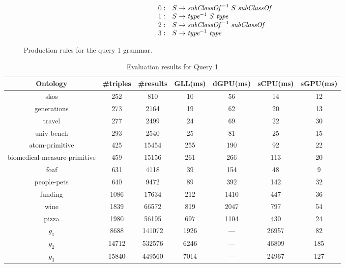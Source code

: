 \begin{figure}[h]
   \[
\begin{array}{rl}
   0: & S \rightarrow \text{\textit{subClassOf}}^{-1} \ S \ \text{\textit{subClassOf}} \\ 
   1: & S \rightarrow \text{\textit{type}}^{-1} \ S \ \text{\textit{type}} \\ 
   2: & S \rightarrow \text{\textit{subClassOf}}^{-1} \ \text{\textit{subClassOf}} \\ 
   3: & S \rightarrow \text{\textit{type}}^{-1} \ \text{\textit{type}} \\ 
\end{array}
\]
\caption{Production rules for the query 1 grammar.}
\label{ProductionRulesQuery1}
\end{figure}

\begin{table*}[ht]
\centering
\caption{Evaluation results for Query 1}
\label{tbl1}

\begin{tabular}{ | c | c | c | c | c | c | c |}
\hline
Ontology & \#triples & \#results & GLL(ms) & dGPU(ms) & sCPU(ms) & sGPU(ms) \\
\hline 
\hline
skos        & 252 & 810 & 10 & 56 & 14 & 12\\
generations & 273 & 2164 & 19 & 62 & 20 & 13\\
travel      & 277 & 2499 & 24 & 69 & 22 & 30\\
univ-bench  & 293 & 2540 & 25 & 81 & 25 & 15\\
atom-primitive & 425 & 15454 & 255 & 190 & 92 & 22\\
biomedical-measure-primitive & 459 & 15156 & 261 & 266 & 113 & 20\\
foaf        & 631 & 4118 & 39 & 154 & 48 & 9\\
people-pets & 640 & 9472 & 89 & 392 & 142 & 32\\
funding     & 1086 & 17634 & 212 & 1410 & 447 & 36\\
wine        & 1839 & 66572 & 819 & 2047 & 797 & 54\\
pizza       & 1980 & 56195 & 697 & 1104 & 430 & 24\\
$g_{1}$     & 8688 & 141072 & 1926 & --- & 26957 & 82\\
$g_{2}$     & 14712 & 532576 & 6246 & --- & 46809 & 185\\
$g_{3}$     & 15840 & 449560 & 7014 & --- & 24967 & 127\\
\hline
\end{tabular}

\end{table*}

